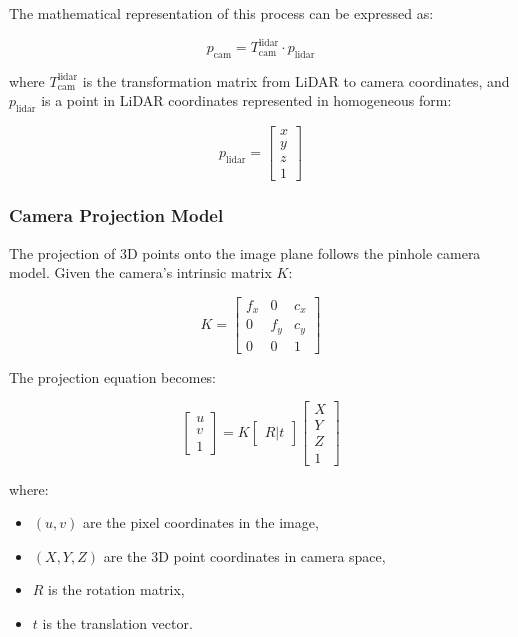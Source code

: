 The mathematical representation of this process can be expressed as:

\[
p_{\text{cam}} = T_{\text{cam}}^{\text{lidar}} \cdot p_{\text{lidar}}
\]

where \( T_{\text{cam}}^{\text{lidar}} \) is the transformation matrix from LiDAR to camera coordinates, and \( p_{\text{lidar}} \) is a point in LiDAR coordinates represented in homogeneous form:

\[
p_{\text{lidar}} = \begin{bmatrix} x \\ y \\ z \\ 1 \end{bmatrix}
\]

\subsubsection{Camera Projection Model}

The projection of 3D points onto the image plane follows the pinhole camera model. Given the camera's intrinsic matrix \( K \):

\[
K = \begin{bmatrix}
f_x & 0 & c_x \\
0 & f_y & c_y \\
0 & 0 & 1
\end{bmatrix}
\]

The projection equation becomes:

\[
\begin{bmatrix} u \\ v \\ 1 \end{bmatrix} = K \begin{bmatrix} R | t \end{bmatrix} \begin{bmatrix} X \\ Y \\ Z \\ 1 \end{bmatrix}
\]

where:
\begin{itemize}
    \item \( (u,v) \) are the pixel coordinates in the image,
    \item \( (X,Y,Z) \) are the 3D point coordinates in camera space,
    \item \( R \) is the rotation matrix,
    \item \( t \) is the translation vector.
\end{itemize}

